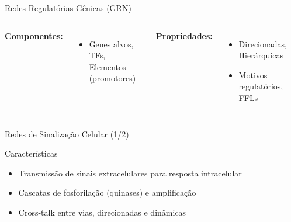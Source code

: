 \begin{frame}[shrink=10]{Redes Regulatórias Gênicas (GRN)}
\begin{columns}
\textbf{Componentes:}
\begin{itemize}
    \item Genes alvos, TFs, Elementos (promotores)
\end{itemize}

\textbf{Propriedades:}
\begin{itemize}
    \item Direcionadas, Hierárquicas
    \item Motivos regulatórios, FFLs
\end{itemize}

\begin{center}
\end{center}
\end{columns}
\end{frame}

\begin{frame}[shrink=10]{Redes de Sinalização Celular (1/2)}
\begin{block}{Características}
\begin{itemize}
    \item Transmissão de sinais extracelulares para resposta intracelular
    \item Cascatas de fosforilação (quinases) e amplificação
    \item Cross-talk entre vias, direcionadas e dinâmicas
\end{itemize}
\end{block}
\end{frame}

